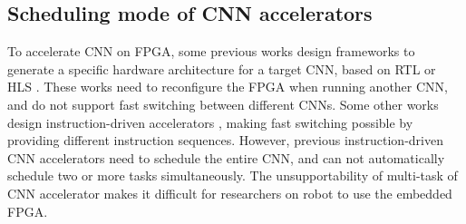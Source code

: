\subsection{ Scheduling mode of CNN accelerators }

To accelerate CNN on FPGA, some previous works design frameworks to generate a specific hardware architecture for a target CNN, based on  RTL \cite{li_high_2016} or HLS \cite{lu_evaluating_2017}. These works need to reconfigure the FPGA when running another CNN, and do not support fast switching between different CNNs. Some other works design instruction-driven accelerators \cite{yu2018instruction,qiu2016going}, making fast switching possible by providing different instruction sequences. However, previous instruction-driven CNN accelerators need to schedule the entire CNN, and can not automatically schedule two or more tasks simultaneously. The unsupportability of multi-task of CNN accelerator makes it difficult for researchers on robot to use the embedded FPGA.